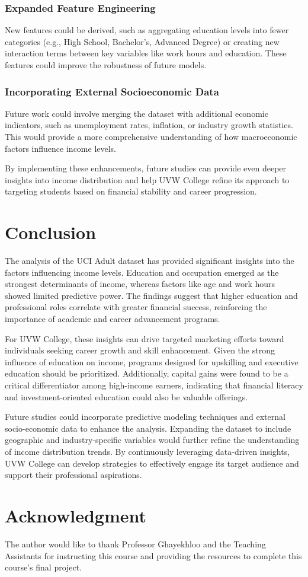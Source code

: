 \documentclass[journal,onecolumn]{IEEEtran}
\begin{document}
\subsubsection{Expanded Feature Engineering}New features could be derived, 
such as aggregating education levels into fewer categories (e.g., High 
School, Bachelor’s, Advanced Degree) or creating new interaction terms 
between key variables like work hours and education. These features could 
improve the robustness of future models.
\subsubsection{Incorporating External Socioeconomic Data}Future work could 
involve merging the dataset with additional economic indicators, such as 
unemployment rates, inflation, or industry growth statistics. This would 
provide a more comprehensive understanding of how macroeconomic factors 
influence income levels.


By implementing these enhancements, future studies can provide even deeper 
insights into income distribution and help UVW College refine its approach 
to targeting students based on financial stability and career progression.


\section{Conclusion}
The analysis of the UCI Adult dataset has provided significant insights into the 
factors influencing income levels. Education and occupation emerged as the strongest 
determinants of income, whereas factors like age and work hours showed 
limited predictive power. The findings suggest that higher education and 
professional roles correlate with greater financial success, reinforcing the 
importance of academic and career advancement programs.

For UVW College, these insights can drive targeted marketing efforts toward 
individuals seeking career growth and skill enhancement. Given the strong influence 
of education on income, programs designed for upskilling and executive education 
should be prioritized. Additionally, capital gains were found to be a critical 
differentiator among high-income earners, indicating that financial literacy and 
investment-oriented education could also be valuable offerings.

Future studies could incorporate predictive modeling techniques and external 
socio-economic data to enhance the analysis. Expanding the dataset to include 
geographic and industry-specific variables would further refine the understanding 
of income distribution trends. By continuously leveraging data-driven insights, UVW 
College can develop strategies to effectively engage its target audience and support 
their professional aspirations.
\section*{Acknowledgment}


The author would like to thank Professor Ghayekhloo and the Teaching Assistants for instructing this course and providing the resources to complete this course's final project.


\end{document}
